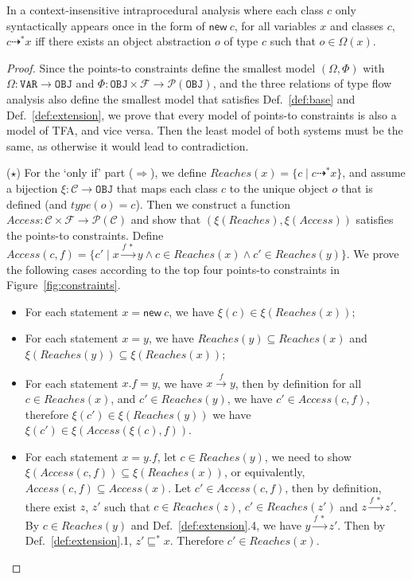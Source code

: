 \documentclass{llncs}
\newcommand{\keyword}[1]{\mathsf{#1}}
\newcommand{\kwnew}[0]{\keyword{new}}
\newcommand\Var{\mathtt{VAR}}
\newcommand\Obj{\mathtt{OBJ}}
\newcommand{\VPT}{\Omega}
\newcommand{\HPT}{\Phi}
\newcommand{\Class}{\mathcal{C}}
\newcommand{\Field}{\mathcal{F}}
\newcommand{\less}{\sqsubseteq}
\newcommand{\tflow}{\dashrightarrow}
\newcommand{\hflow}{\longrightarrow}
\newcommand{\lhflow}[1]{\stackrel{#1}{\hflow}}
\newcommand\set[1]{\{#1\}}
\newcommand\power{\mathcal{P}}
\begin{document}
\begin{lemma}\label{lem:tfa-intra}
In a context-insensitive intraprocedural analysis where each class $c$ only syntactically appears once in the form of $\kwnew\ c$, for all variables $x$ and classes $c$, $c\tflow^*x$ iff there exists an object abstraction $o$ of type $c$ such that $o\in\VPT(x)$.
\end{lemma}
\begin{proof}
Since the points-to constraints define the smallest model $(\VPT, \HPT)$ with $\VPT:\Var\rightarrow\Obj$ and $\HPT:\Obj\times\Field\rightarrow\power(\Obj)$, and the three relations of type flow analysis also define the smallest model that satisfies Def.~\ref{def:base} and Def.~\ref{def:extension}, we prove that every model of points-to constraints is also a model of TFA, and vice versa. Then the least model of both systems must be the same, as otherwise it would lead to contradiction.

\medskip

($\star$) For the `only if' part ($\Rightarrow$), we define $Reaches(x)=\set{c\mid c\tflow^* x}$, and assume a bijection $\xi:\Class\rightarrow\Obj$ that maps each class $c$ to the unique object $o$ that is defined (and $type(o)=c$). Then we construct a function $Access:\Class\times\Field\rightarrow\power(\Class)$ and show that $(\xi(Reaches),\xi(Access))$ satisfies the points-to constraints. Define $Access(c,f)=\set{c'\mid x\lhflow{f\ *}y\wedge c\in Reaches(x)\wedge c'\in Reaches(y)}$. We prove the following cases according to the top four points-to constraints in Figure~\ref{fig:constraints}.
\begin{itemize}
\item For each statement $x = \kwnew\ c$, we have $\xi(c)\in\xi(Reaches(x))$;
\item For each statement $x = y$, we have $Reaches(y)\subseteq Reaches(x)$ and $\xi(Reaches(y))\subseteq\xi(Reaches(x))$;
\item For each statement $x.f = y$, we have $x\lhflow{f}y$, then by definition for all $c\in Reaches(x)$, and $c'\in Reaches(y)$, we have $c'\in Access(c,f)$, therefore $\xi(c')\in\xi(Reaches(y))$ we have $\xi(c')\in \xi(Access(\xi(c),f))$.
\item For each statement $x = y.f$, let $c\in Reaches(y)$, we need to show $\xi(Access(c,f))\subseteq\xi(Reaches(x))$, or equivalently, $Access(c,f)\subseteq Access(x)$. Let $c'\in Access(c,f)$, then by definition, there exist $z$, $z'$ such that $c\in Reaches(z)$, $c'\in Reaches(z')$ and $z\lhflow{f\ *}z'$. By $c\in Reaches(y)$ and Def.~\ref{def:extension}.4, we have $y\lhflow{f\ *}z'$. Then by Def.~\ref{def:extension}.1, $z'\less^*x$. Therefore $c'\in Reaches(x)$.
\end{itemize}


\end{proof}
\end{document}
